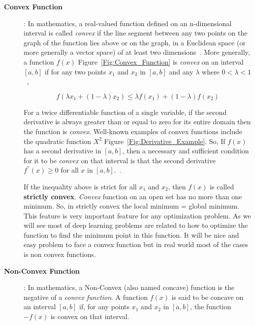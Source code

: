 \begin{description}
  \item [\textbf{Convex Function}]:  In mathematics, a real-valued function defined on an n-dimensional interval is called \textit{convex} if the line segment between any two points on the graph of the function lies above or on the graph, in a Euclidean space (or more generally a vector space) of at least two dimensions~\cite{Wiki_Convex_Function}. More generally, a function $f(x)$ Figure~\ref{Fig:Convex_Function} is \textit{convex} on an interval $[a,b]$ if for any two points $x_1$ and $x_2$ in $[a,b]$ and any $\lambda$ where $0<\lambda<1$~\cite{Rudin_1976},

\begin{equation}\label{eq:convex_fun}
  f(\lambda x_1 + (1-\lambda)x_2) \leq \lambda f(x_1) + (1 - \lambda) f(x_2)
\end{equation}

For a twice differentiable function of a single variable, if the second derivative is always greater than or equal to zero for its entire domain then the function is \textit{convex}. Well-known examples of convex functions include the quadratic function $X^2$ Figure~\ref{Fig:Derivative_Example}. So, If $f(x)$ has a second derivative in $[a,b]$, then a necessary and sufficient condition for it to be \textit{convex} on that interval is that the second derivative $f^{''}(x) \geq 0$ for all $x$ in $[a,b]$.~\cite{Wolfram_Convex}.

If the inequality above is strict for all $x_1$ and $x_2$, then $f(x)$ is called \textbf{strictly convex}. \textit{Convex} function on an open set has no more than one minimum. So, in strictly convex the local minimum = global minimum. This feature is very important feature for any optimization problem. As we will see most of deep learning problems are related to how to optimize the function to find the minimum point in this function. It will be nice and easy problem to face a convex function but in real world most of the cases is non convex functions.


%




\item [\textbf{Non-Convex Function}]: In mathematics, a Non-Convex (also named concave) function is the negative of a \textit{convex function}. A function $f(x)$ is said to be concave on an interval  $[a,b]$ if, for any points $x_1$ and $x_2$ in $[a,b]$, the function  $-f(x)$ is convex on that interval.


\end{description}
